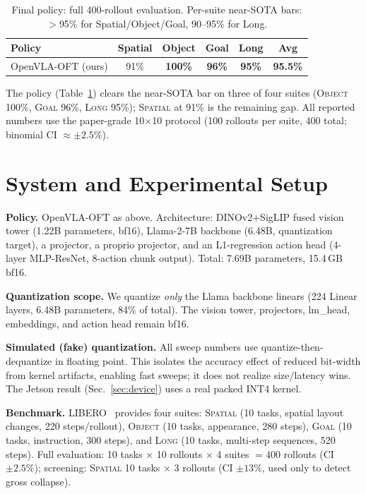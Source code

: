 \documentclass[conference]{IEEEtran}
\begin{document}
\begin{table}[h]\centering\small
\caption{Final policy: full 400-rollout evaluation. Per-suite near-SOTA bars:
$>$95\% for Spatial/Object/Goal, 90--95\% for Long.}
\label{tab:policy}
\begin{tabular}{lccccc}
\toprule
Policy & Spatial & Object & Goal & Long & \textbf{Avg} \\
\midrule
OpenVLA-OFT (ours) & 91\% & \textbf{100\%} & \textbf{96\%} & \textbf{95\%} & \textbf{95.5\%} \\
\bottomrule
\end{tabular}
\end{table}

The policy (Table~\ref{tab:policy}) clears the near-SOTA bar on three of four suites
(\textsc{Object} 100\%, \textsc{Goal} 96\%, \textsc{Long} 95\%); \textsc{Spatial} at 91\%
is the remaining gap. All reported numbers use the paper-grade 10$\times$10 protocol
(100 rollouts per suite, 400 total; binomial CI $\approx\pm2.5\%$).

\section{System and Experimental Setup}
\label{sec:setup}

\textbf{Policy.} OpenVLA-OFT as above. Architecture: DINOv2+SigLIP fused vision tower
(1.22B parameters, bf16), Llama-2-7B backbone (6.48B, quantization target), a projector,
a proprio projector, and an L1-regression action head (4-layer MLP-ResNet, 8-action chunk
output). Total: 7.69B parameters, 15.4\,GB bf16.

\textbf{Quantization scope.} We quantize \emph{only} the Llama backbone linears (224
Linear layers, 6.48B parameters, 84\% of total). The vision tower, projectors, lm\_head,
embeddings, and action head remain bf16.

\textbf{Simulated (fake) quantization.} All sweep numbers use quantize-then-dequantize in
floating point. This isolates the accuracy effect of reduced bit-width from kernel
artifacts, enabling fast sweeps; it does not realize size/latency wins. The Jetson result
(Sec.~\ref{sec:device}) uses a real packed INT4 kernel.

\textbf{Benchmark.} LIBERO~\cite{libero} provides four suites: \textsc{Spatial} (10 tasks,
spatial layout changes, 220 steps/rollout), \textsc{Object} (10 tasks, appearance, 280
steps), \textsc{Goal} (10 tasks, instruction, 300 steps), and \textsc{Long} (10 tasks,
multi-step sequences, 520 steps). Full evaluation: 10 tasks $\times$ 10 rollouts $\times$
4 suites $= 400$ rollouts (CI $\pm2.5\%$); screening: \textsc{Spatial} 10 tasks $\times$ 3
rollouts (CI $\pm13\%$, used only to detect gross collapse).
\end{document}

